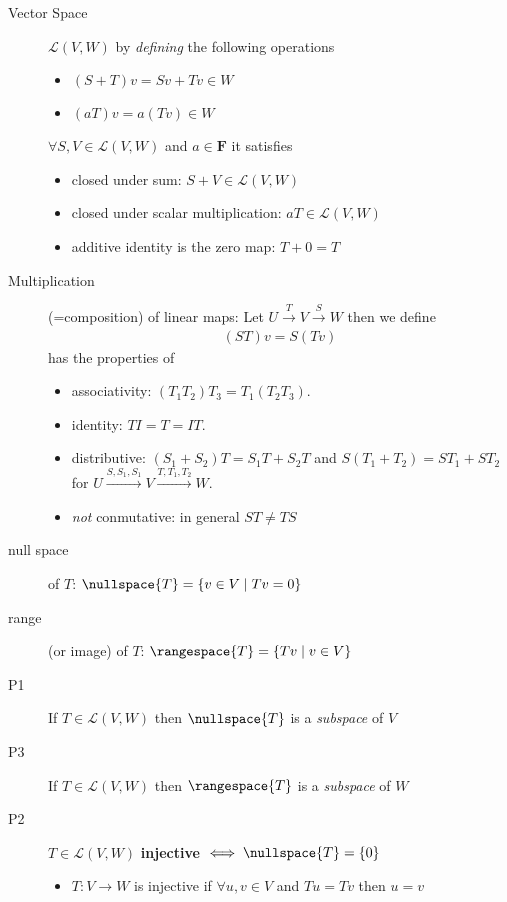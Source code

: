 \begin{description}
  \item[Vector Space] $\mathcal{L}(V,W)$  by \emph{defining} the following operations
  \begin{itemize}
  \item $(S+T)v = Sv + Tv \in W$ 
  \item $(aT)v = a(Tv) \in W$
  \end{itemize}
  $\forall S,V \in \mathcal{L}(V,W)$ and $a\in\mathbf{F}$ it satisfies
  \begin{itemize}
  \item closed under sum: $S+V \in \mathcal{L}(V,W)$
  \item closed under scalar multiplication: $aT \in \mathcal{L}(V,W)$
  \item additive identity is the zero map: $T+0=T$
  \end{itemize}
  \item[Multiplication] (=composition) of linear maps: Let $U \xrightarrow{T} V \xrightarrow{S} W$ then we define
  \begin{align*}
  (ST)v = S(Tv)
  \end{align*}
  has the properties of
  \begin{itemize}
  \item associativity: $(T_1T_2)T_3 = T_1(T_2T_3)$.
  \item identity: $TI = T = IT$.
  \item distributive: $(S_1+S_2)T = S_1T+S_2T$ and $S(T_1+T_2) = ST_1 +ST_2$ for $U\xrightarrow{S,S_1,S_1} V \xrightarrow{T,T_1,T_2} W$.
  \item \emph{not} conmutative: in general $ST \neq TS $
  \end{itemize}
  \item[null space\label{itm:D3_nullspace}] of $T$: $\nullspace{T} = \{v\in V \mid Tv=0\}$
  \item[range] (or image) of $T$: $\rangespace{T} = \{Tv \mid v\in V\}$
  \item[P1\label{itm:P3_1}]If $T\in\mathcal{L}(V,W)$ then $\nullspace{T}$ is a \emph{subspace} of $V$
  \item[P3]If $T\in\mathcal{L}(V,W)$ then $\rangespace{T}$ is a \emph{subspace} of $W$
  \item[P2\label{itm:P3_2}]$T\in\mathcal{L}(V,W)$ \textbf{injective} $\iff \nullspace{T}=\{0\}$
  \begin{itemize}
  \item $T:V\to W$ is injective if $\forall u,v \in V$ and $Tu=Tv$ then $u=v$
  \end{itemize}

\end{description}
